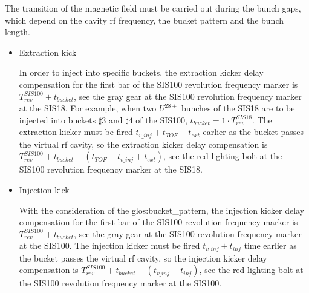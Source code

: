 The transition of the magnetic field must be carried out during the bunch gaps, which depend on the cavity rf frequency, the bucket pattern and the bunch length. 

\begin{itemize}
\item Extraction kick

In order to inject into specific buckets, the extraction kicker delay compensation for the first bar of the SIS100 revolution frequency marker is $T_{\mathit{rev}}^{\mathit{SIS100}} + t_{\mathit{bucket}}$, see the gray gear at the SIS100 revolution frequency marker at the SIS18. For example, when two $U^{28+}$ bunches of the SIS18 are to be injected into buckets $\sharp3$ and $\sharp4$ of the SIS100, $t_{\mathit{bucket}} =1 \cdot T_{\mathit{rev}}^{\mathit{SIS18}}$. The extraction kicker must be fired $t_{\mathit{v\_inj}}+t_{\mathit{TOF}}+t_{\mathit{ext}}$ earlier as the bucket passes the virtual rf cavity, so the extraction kicker delay compensation is $T_{\mathit{rev}}^{\mathit{SIS100}} + t_{\mathit{bucket}} - (t_{\mathit{TOF}} + t_{\mathit{v\_inj}} + t_{\mathit{ext}})$, see the red lighting bolt at the SIS100 revolution frequency marker at the SIS18. 

\item Injection kick

With the consideration of the \gls{glos:bucket_pattern}, the injection kicker delay compensation for the first bar of the SIS100 revolution frequency marker is $T_{\mathit{rev}}^{\mathit{SIS100}} + t_{\mathit{bucket}}$, see the gray gear at the SIS100 revolution frequency marker at the SIS100. The injection kicker must be fired $t_{\mathit{v\_inj}}+t_{\mathit{inj}}$ time earlier as the bucket passes the virtual rf cavity, so the injection kicker delay compensation is $T_{\mathit{rev}}^{\mathit{SIS100}} + t_{\mathit{bucket}} - (t_{\mathit{v\_inj}} + t_{\mathit{inj}})$, see the red lighting bolt at the SIS100 revolution frequency marker at the SIS100.
\end{itemize}

